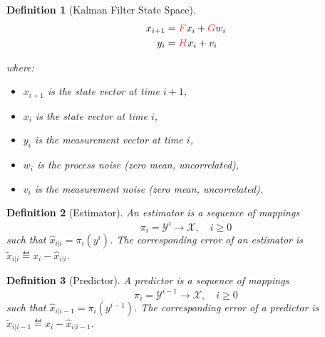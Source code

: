 \documentclass[a4 paper]{article}
\numberwithin{equation}{section}
\theoremstyle{boldStyle}
\theoremstyle{boldBlueStyle}
\theoremstyle{boldPurpleStyle}
\theoremstyle{boldRedStyle}
\newtheorem{definition}{Definition}[section]
\theoremstyle{boldGreenStyle}
\begin{document}
\begin{definition}[Kalman Filter State Space] 
  \begin{equation}
    \begin{aligned}
      x_{i+1} &= \tred{F} x_i + \tred{G} w_i \\
      y_i &= \tred{H} x_i + v_i
    \end{aligned}
  \end{equation}

  where:
\begin{itemize}
    \item \( x_{i+1} \) is the state vector at time \( i+1 \),
    \item \( x_i \) is the state vector at time \( i \),
    \item \( y_i \) is the measurement vector at time \( i \),
    \item \( w_i \) is the process noise (zero mean, uncorrelated),
    \item \( v_i \) is the measurement noise (zero mean, uncorrelated).
\end{itemize}
\end{definition}

\begin{definition}[Estimator]
  An estimator is a sequence of mappings
  \[
  \pi_i = \mathcal{Y}^i \rightarrow \mathcal{X}, \quad i \geq 0
  \]
  such that \( \hat{x}_{i|i} = \pi_i(y^i) \). The corresponding error of an estimator is $\tilde{x}_{i|i} \eqdef x_i - \hat{x}_{i|i}$.
\end{definition}
  
\begin{definition}[Predictor]
  A predictor is a sequence of mappings
  \[
  \pi_i = \mathcal{Y}^{i-1} \rightarrow \mathcal{X}, \quad i \geq 0
  \]
  such that \( \hat{x}_{i|i-1} = \pi_i(y^{i-1}) \). The corresponding error of a predictor is $\tilde{x}_{i|i-1} \eqdef x_i - \hat{x}_{i|i-1}$.
\end{definition}
\end{document}
